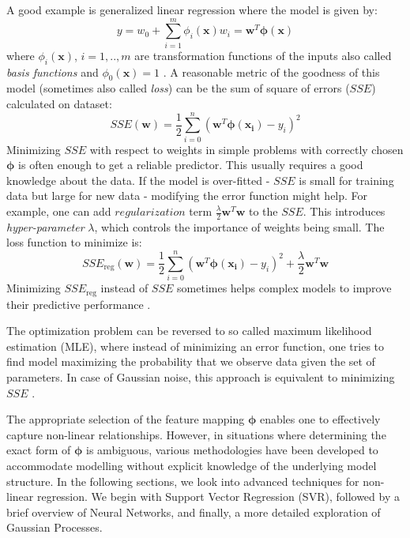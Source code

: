 A good example is generalized linear regression where the model is given by:
\begin{equation}
	\label{eq:gen-linear-model}
	y = w_0 + \sum_{i=1}^{m}\phi_i(\bm{x})w_{i} = \bm{w}^T\bm{\phi}(\bm{x})
\end{equation}
where $\phi_i(\bm{x})$, $i=1,..,m$ are transformation functions of the inputs also called \textit{basis functions} and $\phi_0(\bm{x})=1$ \cite{bishop2006}. A reasonable metric of the goodness of this model (sometimes also called \textit{loss}) can be the sum of square of errors ($SSE$) calculated on dataset:
\begin{equation}
	SSE(\bm{w}) = \frac{1}{2}\sum_{i=0}^{n}\left(\bm{w}^T\bm{\phi}(\bm{x_i})-y_i\right)^2
\end{equation}
Minimizing $SSE$ with respect to weights in simple problems with correctly chosen $\bm{\phi}$ is often enough to get a reliable predictor. This usually requires a good knowledge about the data. If the model is over-fitted - $SSE$ is small for training data but large for new data - modifying the error function might help. For example, one can add $regularization$ term $\frac{\lambda}{2}\bm{w}^T\bm{w}$ to the $SSE$. This introduces \textit{hyper-parameter} $\lambda$, which controls the importance of weights being small. The loss function to minimize is:
\begin{equation}
	SSE_{\mathrm{reg}}(\bm{w}) = \frac{1}{2}\sum_{i=0}^{n}\left(\bm{w}^T\bm{\phi}(\bm{x_i})-y_i\right)^2 + \frac{\lambda}{2}\bm{w}^T\bm{w}
\end{equation}
Minimizing $SSE_{\mathrm{reg}}$ instead of $SSE$ sometimes helps complex models to improve their predictive performance \cite{bishop2006}.

The optimization problem can be reversed to so called maximum likelihood estimation (MLE), where instead of minimizing an error function, one tries to find model maximizing the probability that we observe data given the set of parameters. In case of Gaussian noise, this approach is equivalent to minimizing $SSE$ \cite{bishop2006}.


The appropriate selection of the feature mapping $\bm{\phi}$ enables one to effectively capture non-linear relationships. However, in situations where determining the exact form of $\bm{\phi}$ is ambiguous, various methodologies have been developed to accommodate modelling without explicit knowledge of the underlying model structure. In the following sections, we look into advanced techniques for non-linear regression. We begin with Support Vector Regression (SVR), followed by a brief overview of Neural Networks, and finally, a more detailed exploration of Gaussian Processes.

